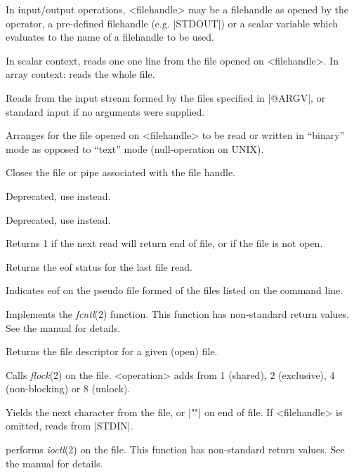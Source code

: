 In input/output operations, <filehandle> may be a filehandle as opened
by the  operator, a pre-defined filehandle (e.g. |STDOUT|)
or a scalar variable which evaluates to the name of a filehandle to be
used.

\begin{enum}{1cm}

In scalar context, reads one one line from the file opened on <filehandle>. 
In array context: reads the whole file.

\Xi{\<\,\>}
Reads from the input stream formed by the files specified in
|@ARGV|, or standard input if no arguments were supplied.

Arranges for the file opened on <filehandle> to be read or written in
``binary'' mode as opposed to ``text'' mode (null-operation on UNIX).

Closes the file or pipe associated with the file handle.

Deprecated, use  instead.

Deprecated, use  instead.

Returns 1 if the next read will return end of file, or if the file is
not open. 

Returns the eof status for the last file read.

Indicates eof on the pseudo file formed of the files listed on the
command line. 

Implements the {\it fcntl\/}(2) function. This function has non-standard
return values. See the manual for details. 

Returns the file descriptor for a given (open) file.

Calls {\it flock\/}(2) on the file. <operation> adds from 1 (shared), 2
(exclusive), 4 (non-blocking) or 8 (unlock). 


Yields the next character from the file, or |""| on end of file.
\newline If <filehandle> is omitted, reads from |STDIN|. 

performs {\it ioctl}(2) on the file. This function has non-standard
return values. See the manual for details. 


\end{enum}
